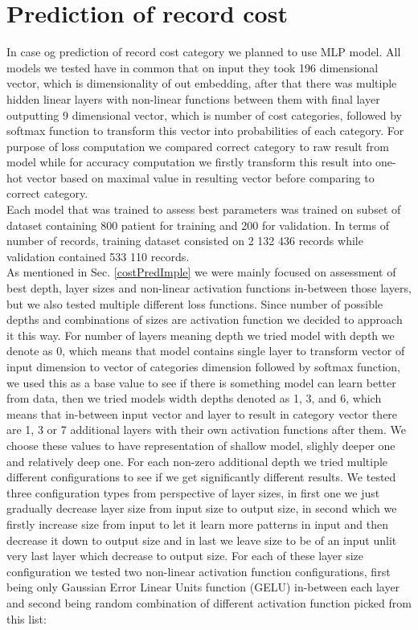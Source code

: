 
\section{Prediction of record cost}
\label{costPredRes}

In case og prediction of record cost category we planned to use MLP model. All models we tested have in common that on input they took 196 dimensional vector, which is dimensionality of out embedding, after that there was multiple hidden linear layers with non-linear functions between them with final layer outputting 9 dimensional vector, which is number of cost categories, followed by softmax function to transform this vector into probabilities of each category. For purpose of loss computation we compared correct category to raw result from model while for accuracy computation we firstly transform this result into one-hot vector based on maximal value in resulting vector before comparing to correct category.
\\

Each model that was trained to assess best parameters was trained on subset of dataset containing 800 patient for training and 200 for validation. In terms of number of records, training dataset consisted on 2 132 436 records while validation contained 533 110 records.
\\

As mentioned in Sec. \ref{costPredImple} we were mainly focused on assessment of best depth, layer sizes and non-linear activation functions in-between those layers, but we also tested multiple different loss functions. Since number of possible depths and combinations of sizes are activation function we decided to approach it this way. For number of layers meaning depth we tried model with depth we denote as 0, which means that model contains single layer to transform vector of input dimension to vector of categories dimension followed by softmax function, we used this as a base value to see if there is something model can learn better from data, then we tried models width depths denoted as 1, 3, and 6, which means that in-between input vector and layer to result in category vector there are 1, 3 or 7 additional layers with their own activation functions after them. We choose these values to have representation of shallow model, slighly deeper one and relatively deep one.
For each non-zero additional depth we tried multiple different configurations to see if we get significantly different results. We tested three configuration types from perspective of layer sizes, in first one we just gradually decrease layer size from input size to output size, in second which we firstly increase size from input to let it learn more patterns in input and then decrease it down to output size and in last we leave size to be of an input unlit very last layer which decrease to output size. For each of these layer size configuration we tested two non-linear activation function configurations, first being only Gaussian Error Linear Units function (GELU) in-between each layer and second being random combination of different activation function picked from this list: 

